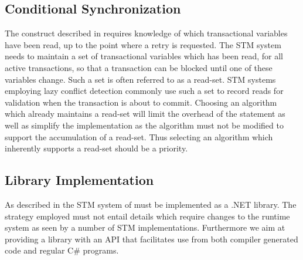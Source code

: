 \subsection{Conditional Synchronization}
\label{subsec:stm_impl_selection_conditional}
The  construct described in  requires knowledge of which transactional variables have been read, up to the point where a retry is requested\cite{harris2005composable}. The \ac{STM} system needs to maintain a set of transactional variables which has been read, for all active transactions, so that a transaction can be blocked until one of these variables change. Such a set is often referred to as a read-set\cite{dice2006transactional}\cite{harris2010transactional}\cite{herlihy2012art}. \ac{STM} systems employing lazy conflict detection commonly use such a set to record reads for validation when the transaction is about to commit\cite{dice2006transactional}\cite{mohamedin2013bytestm}. Choosing an algorithm which already maintains a read-set will limit the overhead of the  statement as well as simplify the implementation as the algorithm must not be modified to support the accumulation of a read-set. Thus selecting an algorithm which inherently supports a read-set should be a priority.

\subsection{Library Implementation}
As described in \bsref{} the \ac{STM} system of \stmnamesp must be implemented as a .NET library. The strategy employed must not entail details which require changes to the runtime system as seen by a number of \ac{STM} implementations\cite{mohamedin2013bytestm}\cite{harris2003language}. Furthermore we aim at providing a library with an \ac{API} that facilitates use from both compiler generated code and regular C\# programs.

